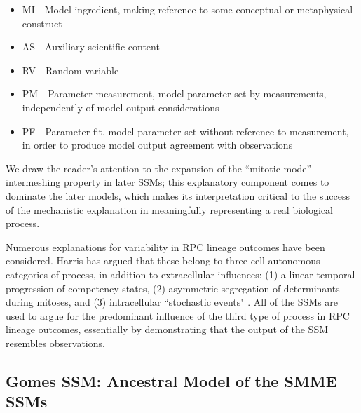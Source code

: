  \begin{itemize}
	\item{MI - Model ingredient, making reference to some conceptual or metaphysical construct}
	\item{AS - Auxiliary scientific content}
	\item{RV - Random variable}
	\item{PM - Parameter measurement, model parameter set by measurements, independently of model output considerations}
	\item{PF - Parameter fit, model parameter set without reference to measurement, in order to produce model output agreement with observations}
\end{itemize}

We draw the reader's attention to the expansion of the ``mitotic mode'' intermeshing property in later SSMs; this explanatory component comes to dominate the later models, which makes its interpretation critical to the success of the mechanistic explanation in meaningfully representing a real biological process. 

Numerous explanations for variability in RPC lineage outcomes have been considered. Harris has argued that these belong to three cell-autonomous categories of process, in addition to extracellular influences: (1) a linear temporal progression of competency states, (2) asymmetric segregation of determinants during mitoses, and (3) intracellular ``stochastic events" \cite{Holt1988,Agathocleous2009}. All of the SSMs are used to argue for the predominant influence of the third type of process in RPC lineage outcomes, essentially by demonstrating that the output of the SSM resembles observations.
 
 \subsection{Gomes SSM: Ancestral Model of the SMME SSMs}
 
